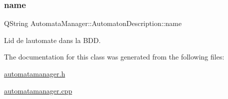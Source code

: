 \mbox{\label{class_automata_manager_1_1_automaton_description_a5a10b5598482bcf7e3c8f871a3e16dad}} 
\subsubsection{\texorpdfstring{name}{name}}
{\footnotesize\ttfamily Q\+String Automata\+Manager\+::\+Automaton\+Description\+::name\hspace{0.3cm}{\ttfamily [private]}}



L\textquotesingle{}id de l\textquotesingle{}automate dans la B\+DD. 



The documentation for this class was generated from the following files\+:\begin{DoxyCompactItemize}
\item 
\mbox{\hyperlink{automatamanager_8h}{automatamanager.\+h}}\item 
\mbox{\hyperlink{automatamanager_8cpp}{automatamanager.\+cpp}}\end{DoxyCompactItemize}
